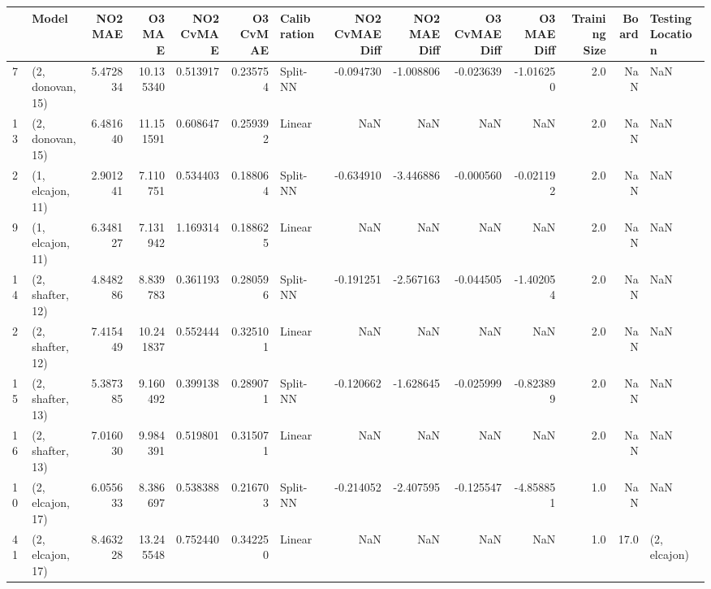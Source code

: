 \begin{tabular}{llrrrrlrrrrrrl}
\toprule
{} &             Model &    NO2 MAE &     O3 MAE &  NO2 CvMAE &  O3 CvMAE & Calibration &  NO2 CvMAE Diff &  NO2 MAE Diff &  O3 CvMAE Diff &  O3 MAE Diff &  Training Size &  Board & Testing Location \\
\midrule
7  &  (2, donovan, 15) &   5.472834 &  10.135340 &   0.513917 &  0.235754 &    Split-NN &       -0.094730 &     -1.008806 &      -0.023639 &    -1.016250 &            2.0 &    NaN &              NaN \\
13 &  (2, donovan, 15) &   6.481640 &  11.151591 &   0.608647 &  0.259392 &      Linear &             NaN &           NaN &            NaN &          NaN &            2.0 &    NaN &              NaN \\
2  &  (1, elcajon, 11) &   2.901241 &   7.110751 &   0.534403 &  0.188064 &    Split-NN &       -0.634910 &     -3.446886 &      -0.000560 &    -0.021192 &            2.0 &    NaN &              NaN \\
9  &  (1, elcajon, 11) &   6.348127 &   7.131942 &   1.169314 &  0.188625 &      Linear &             NaN &           NaN &            NaN &          NaN &            2.0 &    NaN &              NaN \\
14 &  (2, shafter, 12) &   4.848286 &   8.839783 &   0.361193 &  0.280596 &    Split-NN &       -0.191251 &     -2.567163 &      -0.044505 &    -1.402054 &            2.0 &    NaN &              NaN \\
2  &  (2, shafter, 12) &   7.415449 &  10.241837 &   0.552444 &  0.325101 &      Linear &             NaN &           NaN &            NaN &          NaN &            2.0 &    NaN &              NaN \\
15 &  (2, shafter, 13) &   5.387385 &   9.160492 &   0.399138 &  0.289071 &    Split-NN &       -0.120662 &     -1.628645 &      -0.025999 &    -0.823899 &            2.0 &    NaN &              NaN \\
16 &  (2, shafter, 13) &   7.016030 &   9.984391 &   0.519801 &  0.315071 &      Linear &             NaN &           NaN &            NaN &          NaN &            2.0 &    NaN &              NaN \\
10 &  (2, elcajon, 17) &   6.055633 &   8.386697 &   0.538388 &  0.216703 &    Split-NN &       -0.214052 &     -2.407595 &      -0.125547 &    -4.858851 &            1.0 &    NaN &              NaN \\
41 &  (2, elcajon, 17) &   8.463228 &  13.245548 &   0.752440 &  0.342250 &      Linear &             NaN &           NaN &            NaN &          NaN &            1.0 &   17.0 &     (2, elcajon) \\

\end{tabular}
